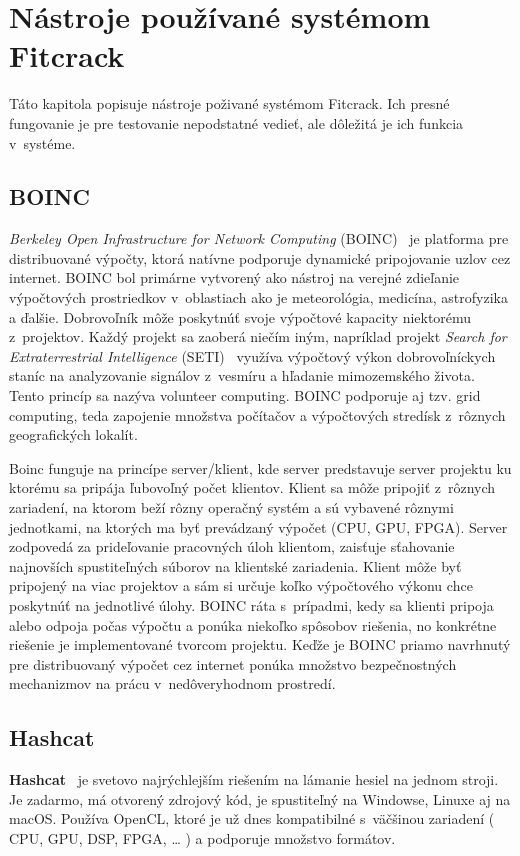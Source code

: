\section{Nástroje používané systémom Fitcrack}
Táto kapitola popisuje nástroje poživané systémom Fitcrack.
Ich presné fungovanie je pre testovanie nepodstatné vedieť, ale dôležitá je ich funkcia v~systéme.

\subsection{BOINC}
\label{boinc}
\textit{Berkeley Open Infrastructure for Network Computing} (BOINC)~\cite{boincintro} je platforma pre distribuované výpočty, ktorá natívne podporuje dynamické pripojovanie uzlov cez internet.
BOINC bol primárne vytvorený ako nástroj na verejné zdieľanie výpočtových  prostriedkov v~oblastiach ako je meteorológia, medicína, astrofyzika a ďalšie.
Dobrovoľník môže poskytnúť svoje výpočtové kapacity niektorému z~projektov.
Každý projekt sa zaoberá niečím iným, napríklad projekt \textit{Search for Extraterrestrial Intelligence} (SETI)~\cite{SETI} využíva výpočtový výkon dobrovoľníckych staníc na analyzovanie signálov z~vesmíru a hľadanie mimozemského života.
Tento princíp sa nazýva volunteer computing.
BOINC podporuje aj tzv. grid computing, teda zapojenie množstva počítačov a výpočtových stredísk z~rôznych geografických lokalít.

Boinc funguje na princípe server/klient, kde server predstavuje server projektu ku ktorému sa pripája ľubovoľný počet klientov.
Klient sa môže pripojiť z~rôznych zariadení, na ktorom beží rôzny operačný systém a sú vybavené rôznymi jednotkami, na ktorých ma byť prevádzaný výpočet (CPU, GPU, FPGA).
Server zodpovedá za prideľovanie pracovných úloh klientom, zaisťuje sťahovanie najnovších spustiteľných súborov na klientské zariadenia.
Klient môže byť pripojený na viac projektov a sám si určuje koľko výpočtového výkonu chce poskytnúť na jednotlivé úlohy.
BOINC ráta s~prípadmi, kedy sa klienti pripoja alebo odpoja počas výpočtu a ponúka niekoľko spôsobov riešenia, no konkrétne riešenie je implementované tvorcom projektu.
Keďže je BOINC priamo navrhnutý pre distribuovaný výpočet cez internet ponúka množstvo bezpečnostných mechanizmov na prácu v~nedôveryhodnom prostredí.

\subsection{Hashcat}
\label{hashcat}
\textbf{Hashcat}~\cite{hashcatnet} je svetovo najrýchlejším riešením na lámanie hesiel na jednom stroji.
Je zadarmo, má otvorený zdrojový kód, je spustiteľný na Windowse, Linuxe aj na macOS.
Používa OpenCL, ktoré je už dnes kompatibilné s~väčšinou zariadení ( CPU, GPU, DSP, FPGA, … ) a podporuje množstvo formátov.

